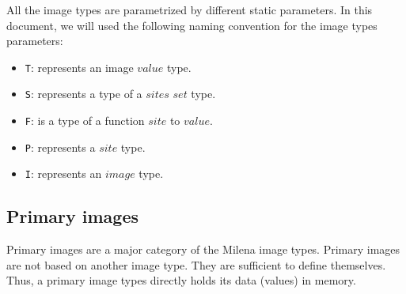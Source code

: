 All the image types are parametrized by different static parameters.
In this document, we will used the following naming convention for the
image types parameters:
\begin{itemize}
\item{\verb+T+:} represents an image $value$ type.
\item{\verb+S+:} represents a type of a $sites$ $set$ type.
\item{\verb+F+:} is a type of a function $site$ to $value$.
\item{\verb+P+:} represents a $site$ type.
\item{\verb+I+:} represents an $image$ type.
\end{itemize}

\subsection{Primary images}


Primary images are a major category of the Milena image types.
Primary images are not based on another image type.
They are sufficient to define themselves.
Thus, a primary image types directly holds its data (values) in memory.


